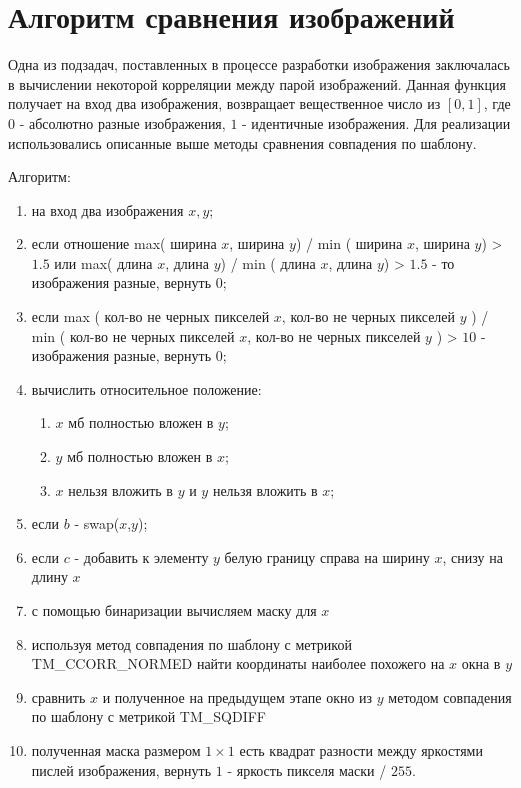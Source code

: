 \documentclass[oneside,final,14pt]{extreport}
\begin{document}
\section{Алгоритм сравнения изображений}
Одна из подзадач, поставленных в процессе разработки изображения заключалась в вычислении некоторой корреляции между парой изображений. Данная функция получает на вход два изображения, возвращает вещественное число из $[0,1]$, где $0$ - абсолютно разные изображения, $1$ - идентичные изображения.  Для реализации использовались описанные выше методы сравнения совпадения по шаблону.

Алгоритм:

\begin{enumerate}%
\item на вход два изображения $x, y$;
\item если отношение max( ширина $x$, ширина $y$) / min ( ширина $x$, ширина $y$) > $1.5$ или max( длина $x$, длина $y$) / min ( длина $x$, длина $y$) > $1.5$ - то изображения разные, вернуть $0$;
\item если  max ( кол-во не черных пикселей $x$,  кол-во не черных пикселей $y$ ) / min ( кол-во не черных пикселей $x$,  кол-во не черных пикселей $y$ ) > $10$ - изображения разные, вернуть $0$;
\item вычислить относительное положение: 

\begin{enumerate}%
\item $x$ мб полностью  вложен в $y$;
\item $y$ мб полностью вложен в $x$;
\item $x$ нельзя вложить в $y$ и $y$ нельзя вложить в  $x$;
\end{enumerate}

\item если $b$ - swap($x$,$y$);
\item если $c$ - добавить к элементу $y$ белую границу справа на ширину $x$, снизу на длину $x$
\item с помощью бинаризации вычисляем маску для $x$
\item используя метод совпадения по шаблону с метрикой TM\_CCORR\_NORMED найти координаты наиболее похожего на $x$ окна в $y$
\item сравнить $x$ и полученное на предыдущем этапе окно из $y$ методом совпадения по шаблону с метрикой TM\_SQDIFF
\item полученная маска размером $1 \times 1$ есть квадрат разности между яркостями пислей изображения, вернуть $1$ - яркость пикселя маски / $255$.
\end{enumerate}
\end{document}
